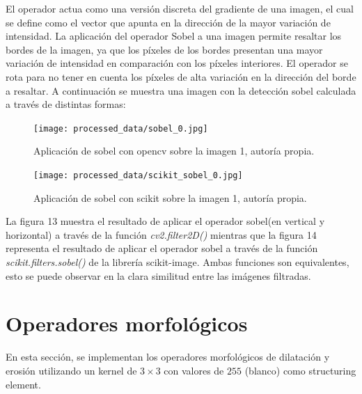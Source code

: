 \documentclass[a4paper,12pt]{article}
\begin{document}
{\vspace{0.5cm}

El operador actua como una versión discreta del gradiente de una imagen, el cual se define como el vector que apunta en la dirección de la mayor variación de intensidad.
La aplicación del operador Sobel a una imagen permite resaltar los bordes de la imagen, ya que los píxeles de los bordes presentan una mayor variación de intensidad
en comparación con los píxeles interiores. El operador se rota para no tener en cuenta los píxeles de alta variación en la dirección del borde a resaltar. A continuación se 
muestra una imagen con la detección sobel calculada a través de distintas formas:

\vspace{0.5cm}

\begin{figure}[H]

  \begin{minipage}[t]{0.4\textwidth}
      \centering
      \texttt{[image: processed\_data/sobel\_0.jpg]} 
      \caption{Aplicación de sobel con opencv sobre la imagen 1, autoría propia.}
      \label{fig:cv2-sobel}
  \end{minipage}
  \hfill
  \hspace{1.5cm}
  \begin{minipage}[t]{0.4\textwidth}
      \centering
      \texttt{[image: processed\_data/scikit\_sobel\_0.jpg]} 
      \caption{Aplicación de sobel con scikit sobre la imagen 1, autoría propia.}
      \label{fig:scikit-sobel}
  \end{minipage}
  
\end{figure}

\vspace{0.5cm}

La figura 13 muestra el resultado de aplicar el operador sobel(en vertical y horizontal) a través de la función \textit{cv2.filter2D()}
mientras que la figura 14 representa el resultado de aplicar el operador sobel a través de la función \textit{scikit.filters.sobel()} de la librería scikit-image.
Ambas funciones son equivalentes, esto se puede observar en la clara similitud entre las imágenes filtradas.

\section{Operadores morfológicos}

En esta sección, se implementan los operadores morfológicos de dilatación y erosión
utilizando un kernel de \(3 \times 3\) con valores de \(255\) (blanco) como structuring element. 

}
\end{document}
